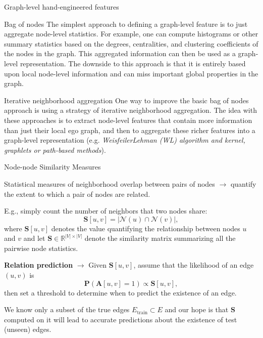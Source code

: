 \documentclass[10pt, aspectratio=169, compress, protectframetitle, handout]{beamer}
\begin{document}
\begin{frame}{Graph-level hand-engineered features}

    \begin{block}{Bag of nodes}
        The simplest approach to defining a graph-level feature is to just aggregate node-level statistics. For example, one can compute histograms or other summary statistics based on the degrees, centralities, and clustering coefficients of the nodes in the graph. This aggregated information can then be used as a graph-level representation. The downside to this approach is that it is entirely based upon local node-level information and can miss important global properties in the graph.
    \end{block}
    
    \begin{block}{Iterative neighborhood aggregation}
        One way to improve the basic bag of nodes approach is using a strategy of \alert{iterative neighborhood aggregation}. The idea with these approaches is to extract node-level features that contain more information than just their local ego graph, and then to aggregate these richer features into a graph-level representation (e.g. \emph{WeisfeilerLehman (WL) algorithm and kernel, graphlets or path-based methods}).
    \end{block}
    
\end{frame}


\begin{frame}{Node-node Similarity Measures}

    Statistical \alert{measures of neighborhood overlap} between pairs of nodes $\longrightarrow$ quantify the extent to which a pair of nodes are related.
    
    \begin{block}{}%
    E.g., simply count the number of neighbors that two nodes share:
    \begin{equation}
        \mathbf S[u, v] = |\mathcal N(u) \cap \mathcal N(v)|,
    \end{equation}
    where $\mathbf S[u, v]$ denotes the value quantifying the relationship between nodes $u$ and $v$ and let $\mathbf S \in \mathbb R^{|V| \times |V|}$ denote the \alert{similarity matrix} summarizing all the pairwise node statistics.
    \end{block}

    \textbf{Relation prediction} $\longrightarrow$ Given $\mathbf S[u, v]$, assume that the likelihood of an edge $(u, v)$ is
    \begin{equation}
        \mathbf P (\mathbf A[u, v] = 1) \propto \mathbf S[u, v],
    \end{equation}
    then set a threshold to determine when to predict the existence of an edge.
    
    We know only a subset of the true edges $E_\text{train} \subset E$ and our hope is that $\mathbf S$ computed on it will lead to accurate predictions about the existence of test (unseen) edges.
    
\end{frame}
\end{document}

